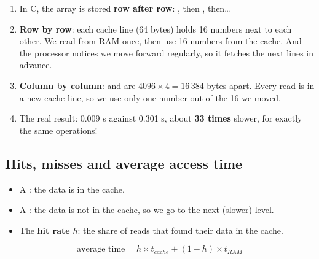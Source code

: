 \begin{center}
\end{center}

\begin{khatwa}
    \begin{enumerate}
        \item In C, the array  is stored \textbf{row after row}: , then , then\dots
        \item \textbf{Row by row}: each cache line (64 bytes) holds 16 numbers next to each other. We read from RAM once, then use
              16 numbers from the cache. And the processor notices we move forward regularly, so it fetches the next lines in advance.
        \item \textbf{Column by column}:  and  are $4096 \times 4 = 16\,384$ bytes apart. Every read is
              in a new cache line, so we use only one number out of the 16 we moved.
        \item The real result: 0.009 s against 0.301 s, about \textbf{33 times} slower, for exactly the same operations!
    \end{enumerate}
\end{khatwa}

\subsection{Hits, misses and average access time}
\begin{tarif}
    \begin{itemize}
        \item A : the data is in the cache.
        \item A : the data is not in the cache, so we go to the next (slower) level.
        \item The \textbf{hit rate} $h$: the share of reads that found their data in the cache.
    \end{itemize}
    \[ \text{average time} = h \times t_{cache} + (1 - h) \times t_{RAM} \]
\end{tarif}

